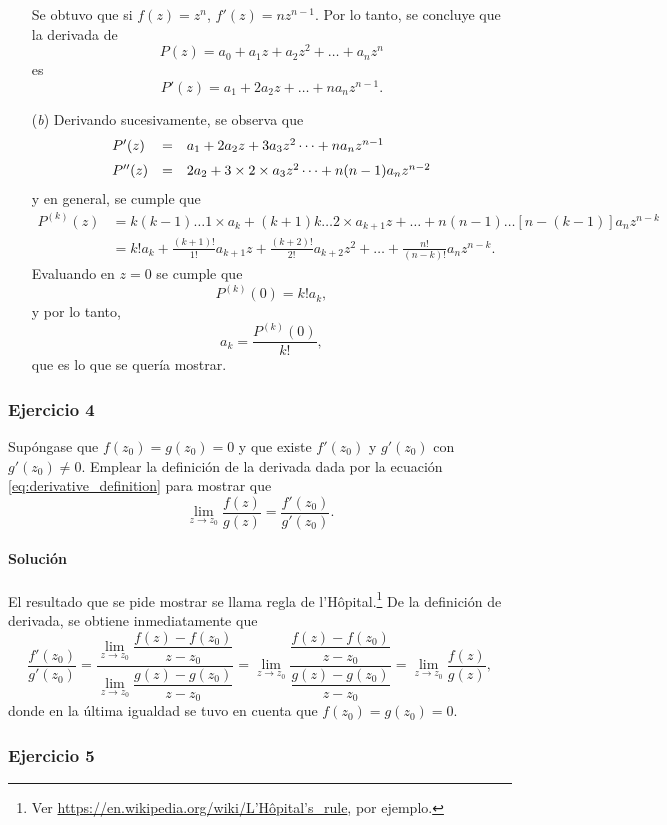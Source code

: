 \documentclass[a4paper]{report}
\begin{document}
\begin{enumerate}
Se obtuvo que si \(f(z)=z^n\), \(f'(z)=nz^{n-1}\). Por lo tanto, se concluye que la derivada de
\[
  P(z)=a_0+a_1z+a_2z^2+\dots+a_nz^n
\]
es
\[
 P'(z)=a_1+2a_2z+\dots+na_nz^{n-1}.
\]
 \item[(\textit{b})] Derivando sucesivamente, se observa que
\[
 \begin{array}{lll}
  P'(z)&=&a_1+2a_2z+3a_3z^2\dots+na_nz^{n-1}\\[\medskipamount]
  P''(z)&=&2a_2+3\times2\times a_3z^2\dots+n(n-1)a_nz^{n-2}
 \end{array}
\]
y en general, se cumple que 
\begin{align*}
 P^{(k)}(z)&=k(k-1)\dots1\times a_k+(k+1)k\dots2\times a_{k+1}z+\dots+n(n-1)\dots[n-(k-1)]a_nz^{n-k}\\
 &=k!a_k+\frac{(k+1)!}{1!}a_{k+1}z+\frac{(k+2)!}{2!}a_{k+2}z^2+\dots+\frac{n!}{(n-k)!}a_nz^{n-k}.
\end{align*}
Evaluando en \(z=0\) se cumple que 
\[
 P^{(k)}(0)=k!a_k,
\]
y por lo tanto,
\[
 a_k=\frac{P^{(k)}(0)}{k!},
\]
que es lo que se quería mostrar.
\end{enumerate}

\subsubsection{Ejercicio 4}

Supóngase que \(f(z_0)=g(z_0)=0\) y que existe \(f'(z_0)\) y \(g'(z_0)\) con \(g'(z_0)\neq0\). Emplear la definición de la derivada dada por la ecuación \ref{eq:derivative_definition} para mostrar que 
\[
 \lim_{z\to z_0}\frac{f(z)}{g(z)}=\frac{f'(z_0)}{g'(z_0)}.
\]

\paragraph{Solución} El resultado que se pide mostrar se llama regla de l'Hôpital.\footnote{Ver \href{https://en.wikipedia.org/wiki/L\%27H\%C3\%B4pital\%27s\_rule}{https://en.wikipedia.org/wiki/L'Hôpital's\_rule}, por ejemplo.} De la definición de derivada, se obtiene inmediatamente que
\[
 \frac{f'(z_0)}{g'(z_0)}=\dfrac{\lim\limits_{z\to z_0}\dfrac{f(z)-f(z_0)}{z-z_0}}{\lim\limits_{z\to z_0}\dfrac{g(z)-g(z_0)}{z-z_0}}
 =\lim_{z\to z_0}\dfrac{\dfrac{f(z)-f(z_0)}{z-z_0}}{\dfrac{g(z)-g(z_0)}{z-z_0}}
 =\lim_{z\to z_0}\frac{f(z)}{g(z)},
\]
donde en la última igualdad se tuvo en cuenta que \(f(z_0)=g(z_0)=0\).

\subsubsection{Ejercicio 5}
\end{document}
